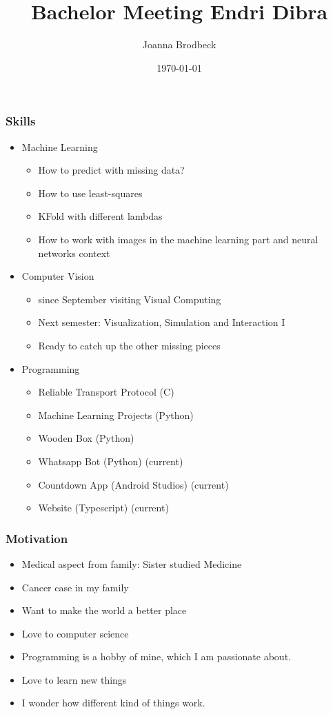 \documentclass{article}
\title{Bachelor Meeting Endri Dibra}
\author{Joanna Brodbeck}
\date{\today}
\begin{document}
\maketitle


\subsubsection*{Skills}
\begin{itemize}
    \item Machine Learning
    \begin{itemize}
        \item How to predict with missing data?
        \item How to use least-squares
        \item KFold with different lambdas
        \item How to work with images in the machine learning part and neural networks context
    \end{itemize}
    \item Computer Vision
    \begin{itemize}
        \item since September visiting Visual Computing
        \item Next semester: Visualization, Simulation and Interaction I
        \item Ready to catch up the other missing pieces
    \end{itemize}
    \item Programming
    \begin{itemize}
        \item Reliable Transport Protocol (C)
        \item Machine Learning Projects (Python)
        \item Wooden Box (Python)
        \item Whatsapp Bot (Python) (current)
        \item Countdown App (Android Studios) (current)
        \item Website (Typescript) (current)
    \end{itemize}
\end{itemize}

\subsubsection*{Motivation}
\begin{itemize}
    \item Medical aspect from family: Sister studied Medicine
    \item Cancer case in my family
    \item Want to make the world a better place
    \item Love to computer science
    \item Programming is a hobby of mine, which I am passionate about.
    \item Love to learn new things
    \item I wonder how different kind of things work.
\end{itemize}
\end{document}
